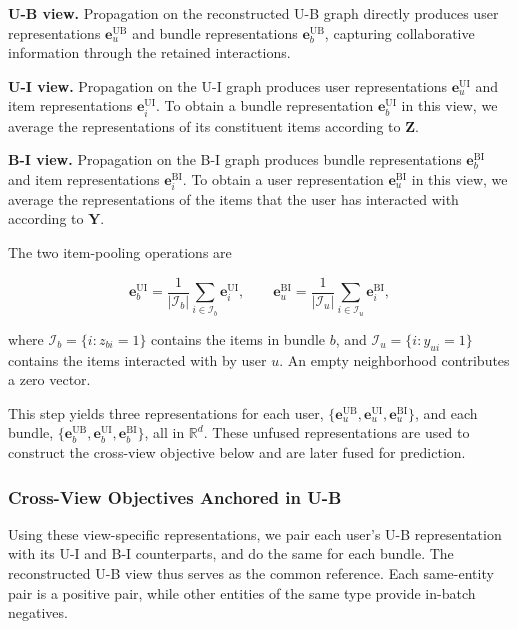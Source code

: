 \documentclass[letterpaper]{article}
\begin{document}
\textbf{U-B view.} Propagation on the reconstructed U-B graph directly produces user representations $\mathbf e_u^{\mathrm{UB}}$ and bundle representations $\mathbf e_b^{\mathrm{UB}}$, capturing collaborative information through the retained interactions.

\textbf{U-I view.} Propagation on the U-I graph produces user representations $\mathbf e_u^{\mathrm{UI}}$ and item representations $\mathbf e_i^{\mathrm{UI}}$. To obtain a bundle representation $\mathbf e_b^{\mathrm{UI}}$ in this view, we average the representations of its constituent items according to $\mathbf Z$.

\textbf{B-I view.} Propagation on the B-I graph produces bundle representations $\mathbf e_b^{\mathrm{BI}}$ and item representations $\mathbf e_i^{\mathrm{BI}}$. To obtain a user representation $\mathbf e_u^{\mathrm{BI}}$ in this view, we average the representations of the items that the user has interacted with according to $\mathbf Y$.

The two item-pooling operations are

\begin{equation}
\mathbf e_b^{\mathrm{UI}}
=\frac{1}{|\mathcal I_b|}
\sum_{i\in\mathcal I_b}\mathbf e_i^{\mathrm{UI}},
\qquad
\mathbf e_u^{\mathrm{BI}}
=\frac{1}{|\mathcal I_u|}
\sum_{i\in\mathcal I_u}\mathbf e_i^{\mathrm{BI}},
\tag{10}
\end{equation}

where $\mathcal I_b=\{i:z_{bi}=1\}$ contains the items in bundle $b$, and $\mathcal I_u=\{i:y_{ui}=1\}$ contains the items interacted with by user $u$. An empty neighborhood contributes a zero vector.

This step yields three representations for each user, $\{\mathbf e_u^{\mathrm{UB}},\mathbf e_u^{\mathrm{UI}},\mathbf e_u^{\mathrm{BI}}\}$, and each bundle, $\{\mathbf e_b^{\mathrm{UB}},\mathbf e_b^{\mathrm{UI}},\mathbf e_b^{\mathrm{BI}}\}$, all in $\mathbb R^d$. These unfused representations are used to construct the cross-view objective below and are later fused for prediction.

\subsubsection{Cross-View Objectives Anchored in U-B}

Using these view-specific representations, we pair each user's U-B representation with its U-I and B-I counterparts, and do the same for each bundle. The reconstructed U-B view thus serves as the common reference. Each same-entity pair is a positive pair, while other entities of the same type provide in-batch negatives.
\end{document}
